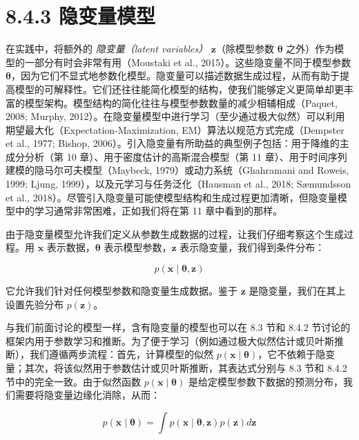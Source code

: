 \section*{8.4.3 隐变量模型}

在实践中，将额外的 \emph{隐变量（latent variables）} $ \boldsymbol{z} $（除模型参数 $ \boldsymbol{\theta} $ 之外）作为模型的一部分有时会非常有用（Moustaki et al., 2015）。这些隐变量不同于模型参数 $ \boldsymbol{\theta} $，因为它们不显式地参数化模型。隐变量可以描述数据生成过程，从而有助于提高模型的可解释性。它们还往往能简化模型的结构，使我们能够定义更简单却更丰富的模型架构。模型结构的简化往往与模型参数数量的减少相辅相成（Paquet, 2008; Murphy, 2012）。在隐变量模型中进行学习（至少通过极大似然）可以利用期望最大化（Expectation-Maximization, EM）算法以规范方式完成（Dempster et al., 1977; Bishop, 2006）。引入隐变量有所助益的典型例子包括：用于降维的主成分分析（第 10 章）、用于密度估计的高斯混合模型（第 11 章）、用于时间序列建模的隐马尔可夫模型（Maybeck, 1979）或动力系统（Ghahramani and Roweis, 1999; Ljung, 1999），以及元学习与任务泛化（Hausman et al., 2018; Sæmundsson et al., 2018）。尽管引入隐变量可能使模型结构和生成过程更加清晰，但隐变量模型中的学习通常非常困难，正如我们将在第 11 章中看到的那样。

由于隐变量模型允许我们定义从参数生成数据的过程，让我们仔细考察这个生成过程。用 $ \boldsymbol{x} $ 表示数据，$ \boldsymbol{\theta} $ 表示模型参数，$ \boldsymbol{z} $ 表示隐变量，我们得到条件分布：

\begin{equation}
p(\boldsymbol{x} \mid \boldsymbol{\theta}, \boldsymbol{z})
\tag{8.24}\label{eq:8-24}
\end{equation}

它允许我们针对任何模型参数和隐变量生成数据。鉴于 $ \boldsymbol{z} $ 是隐变量，我们在其上设置先验分布 $ p(\boldsymbol{z}) $。

与我们前面讨论的模型一样，含有隐变量的模型也可以在 8.3 节和 8.4.2 节讨论的框架内用于参数学习和推断。为了便于学习（例如通过极大似然估计或贝叶斯推断），我们遵循两步流程：首先，计算模型的似然 $ p(\boldsymbol{x} \mid \boldsymbol{\theta}) $，它不依赖于隐变量；其次，将该似然用于参数估计或贝叶斯推断，其表达式分别与 8.3 节和 8.4.2 节中的完全一致。由于似然函数 $ p(\boldsymbol{x} \mid \boldsymbol{\theta}) $ 是给定模型参数下数据的预测分布，我们需要将隐变量边缘化消除，从而：

\begin{equation}
p(\boldsymbol{x} \mid \boldsymbol{\theta}) = \int p(\boldsymbol{x} \mid \boldsymbol{\theta}, \boldsymbol{z}) p(\boldsymbol{z}) d\boldsymbol{z}
\tag{8.25}\label{eq:8-25}
\end{equation}

